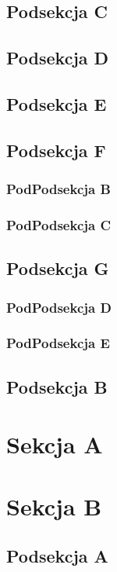 \subsection{Podsekcja C}

\subsection*{Podsekcja D}
\subsection*{Podsekcja E}

\subsection{Podsekcja F}
\subsubsection{PodPodsekcja B}
\subsubsection{PodPodsekcja C}

\subsection{Podsekcja G}
\subsubsection*{PodPodsekcja D}
\subsubsection*{PodPodsekcja E}

\newpage
\subsection{Podsekcja B}
\lipsum[1-3]


\newpage
\section{Sekcja A}
\lipsum[1]
\section*{Sekcja B}
\lipsum[1]
\subsection*{Podsekcja A}
\indent \lipsum[1]

